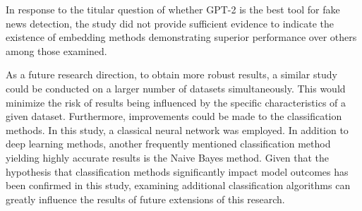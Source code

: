 In response to the titular question of whether GPT-2 is the best tool for fake news detection, the study did not provide sufficient evidence to indicate the existence of embedding methods demonstrating superior performance over others among those examined.

As a future research direction, to obtain more robust results, a similar study could be conducted on a larger number of datasets simultaneously. This would minimize the risk of results being influenced by the specific characteristics of a given dataset. Furthermore, improvements could be made to the classification methods. In this study, a classical neural network was employed. In addition to deep learning methods, another frequently mentioned classification method yielding highly accurate results is the Naive Bayes method. Given that the hypothesis that classification methods significantly impact model outcomes has been confirmed in this study, examining additional classification algorithms can greatly influence the results of future extensions of this research.